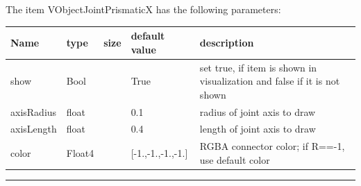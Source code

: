 The item VObjectJointPrismaticX has the following parameters:\vspace{-1cm}\\ 
\begin{center}
  \footnotesize
  \begin{longtable}{| p{4.5cm} | p{2.5cm} | p{0.5cm} | p{2.5cm} | p{6cm} |}
    \hline
    \bf Name & \bf type & \bf size & \bf default value & \bf description \\ \hline
    show &     Bool &      &     True &     set true, if item is shown in visualization and false if it is not shown\\ \hline
    axisRadius &     float &      &     0.1 &     radius of joint axis to draw\\ \hline
    axisLength &     float &      &     0.4 &     length of joint axis to draw\\ \hline
    color &     Float4 &      &     [-1.,-1.,-1.,-1.] &     RGBA connector color; if R==-1, use default color\\ \hline
	  \end{longtable}
	\end{center}
\par\noindent\rule{\textwidth}{0.4pt}
\label{description_ObjectJointPrismaticX}
